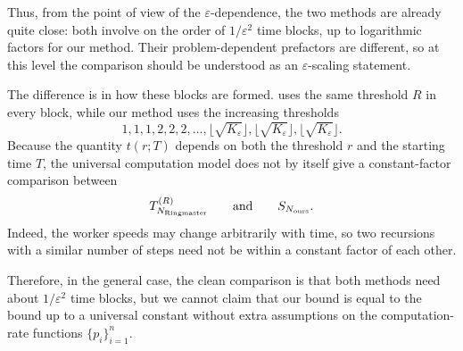 \documentclass{article}
\begin{document}
Thus, from the point of view of the $\varepsilon$-dependence, the two methods are already quite close: both involve on the order of $1/\varepsilon^2$ time blocks, up to logarithmic factors for our method.
Their problem-dependent prefactors are different, so at this level the comparison should be understood as an $\varepsilon$-scaling statement.

The difference is in how these blocks are formed.
\ringmaster uses the same threshold $R$ in every block, while our method uses the increasing thresholds
\begin{equation*}
    1,1,1,2,2,2,\dots,\lfloor \sqrt{K_{\varepsilon}} \rfloor,\lfloor \sqrt{K_{\varepsilon}} \rfloor,\lfloor \sqrt{K_{\varepsilon}} \rfloor .
\end{equation*}
Because the quantity $t(r;T)$ depends on both the threshold $r$ and the starting time $T$, the universal computation model does not by itself give a constant-factor comparison between
\begin{equation*}
    T^{(R)}_{N_{\rm Ringmaster}}
    \qquad \text{and} \qquad
    S_{N_{\rm ours}}.
\end{equation*}
Indeed, the worker speeds may change arbitrarily with time, so two recursions with a similar number of steps need not be within a constant factor of each other.

Therefore, in the general case, the clean comparison is that both methods need about $1/\varepsilon^2$ time blocks, but we cannot claim that our bound is equal to the \ringmaster bound up to a universal constant without extra assumptions on the computation-rate functions $\{p_i\}_{i=1}^n$.
\end{document}
